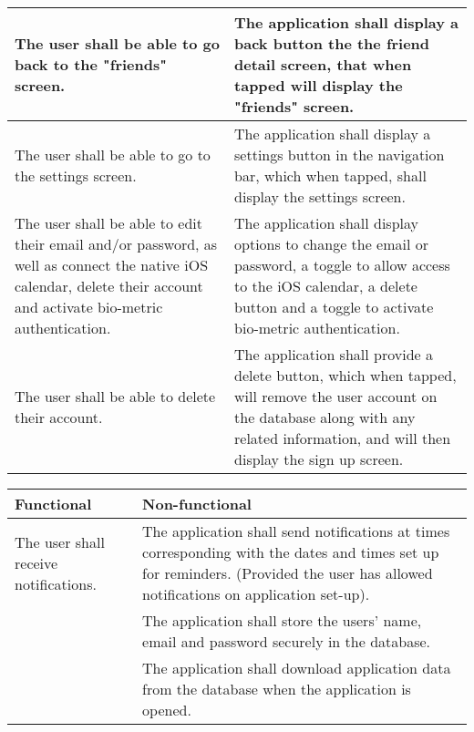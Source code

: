 \begin{table}[H]
\begin{tabular}{|p{7cm}|p{7cm}|}
        \hline
        The user shall be able to go back to the "friends" screen.& The application shall display a back button the the friend detail screen, that when tapped will display the "friends" screen.\\
        \hline
        The user shall be able to go to the settings screen.& The application shall display a settings button in the navigation bar, which when tapped, shall display the settings screen.\\
        \hline
        The user shall be able to edit their email and/or password, as well as connect the native iOS calendar, delete their account and activate bio-metric authentication.& The application shall display options to change the email or password, a toggle to allow access to the iOS calendar, a delete button and a toggle to activate bio-metric authentication.\\
        \hline
        The user shall be able to delete their account.& The application shall provide a delete button, which when tapped, will remove the user account on the database along with any related information, and will then display the sign up screen.\\
        \hline
    \end{tabular}
\end{table}

\begin{table}[H]
    \centering
    \begin{tabular}{|p{7cm}|p{7cm}|}
        \hline
        Functional& Non-functional\\
        \hline
        The user shall receive notifications.& The application shall send notifications at times corresponding with the dates and times set up for reminders. (Provided the user has allowed notifications on application set-up).\\
        \hline
        & The application shall store the users' name, email and password securely in the database.\\
        \hline
        & The application shall download application data from the database when the application is opened.\\
        \hline
    \end{tabular}
\end{table}
